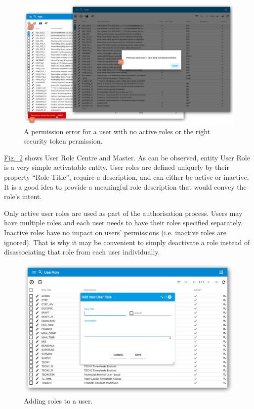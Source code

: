 \documentclass[a4paper,12pt,oneside,openright]{memoir}
\begin{document}
	\begin{figure}[h!tbp]
	\centering
	\includegraphics[width=\linewidth]{images/06-permission-denied.png}
	\caption{A permission error for a user with no active roles or the right security token permission.}\label{sec:03_01:fig:1}
	\end{figure}

	\hyperref[sec:03_01:fig:2]{Fig.~\ref*{sec:03_01:fig:2}} shows User Role Centre and Master.
	As can be observed, entity User Role is a very simple activatable entity.
	User roles are defined uniquely by their property ``Role Title'', require a description, and can either be active or inactive.
	It is a good idea to provide a meaningful role description that would convey the role's intent.

	Only active user roles are used as part of the authorisation process.
	Users may have multiple roles and each user needs to have their roles specified separately.
	Inactive roles have no impact on users' permissions (i.e. inactive roles are ignored).
	That is why it may be convenient to simply deactivate a role instead of disassociating that role from each user individually.

	\begin{figure}[h!tbp]
	\centering
	\includegraphics[width=0.8\linewidth]{images/07-new-user-role.png}
	\caption{Adding roles to a user.}\label{sec:03_01:fig:2}
	\end{figure}
\end{document}
